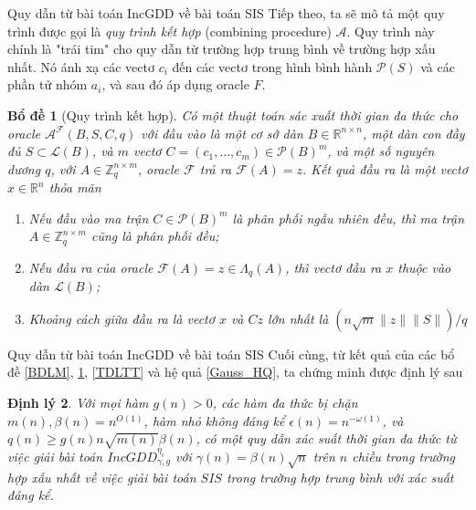 \documentclass[notheorems,envcountsect,serif,12pt]{beamer}
\providecommand{\norm}[1]{\lVert#1\rVert}
\newcommand{\R}{\mathbb{R}}
\newcommand{\Z}{\mathbb{Z}}
\numberwithin{equation}{section}
\newtheorem{theorem}{Định lý}[section]
\newtheorem{lemma}[theorem]{Bổ đề}
\theoremstyle{definition}
\numberwithin{equation}{section}
\begin{document}
\begin{frame}{Quy dẫn từ bài toán IncGDD về bài toán SIS}
	Tiếp theo, ta sẽ mô tả một quy trình được gọi là \textit{quy trình kết hợp} (combining procedure) $\mathcal{A}$. Quy trình này chính là "trái tim" cho quy dẫn từ trường hợp trung bình về trường hợp xấu nhất. Nó ánh xạ các vectơ $c_i$ đến các vectơ trong hình bình hành $\mathcal{P}(S)$ và các phần tử nhóm $a_i$, và sau đó áp dụng oracle $F$.
	\begin{lemma}[Quy trình kết hợp]\label{QTKH}
		Có một thuật toán sác xuất thời gian đa thức cho oracle $\mathcal{A}^{\mathcal{F}}(B, S, C, q)$ với đầu vào là một cơ sở dàn $B\in \R^{n\times n}$, một dàn con đầy đủ $S\subset \mathcal{L}(B)$, và $m$ vectơ $C=\left(c_1,\ldots, c_m\right)\in \mathcal{P}(B)^m$, và một số nguyên dương $q$, với $A\in \Z_q^{n\times m}$, oracle $\mathcal{F}$ trả ra $\mathcal{F}(A)=z$. Kết quả đầu ra là một vectơ $x\in \R^n$ thỏa mãn
		\begin{enumerate}
			\item Nếu đầu vào ma trận $C\in \mathcal{P}(B)^m$ là phân phối ngẫu nhiên đều, thì ma trận $A\in \Z_q^{n\times m}$ cũng là phân phối đều;
			\item Nếu đầu ra của oracle $\mathcal{F}(A)=z\in\Lambda_q(A)$, thì vectơ đầu ra $x$ thuộc vào dàn $\mathcal{L}(B)$;
			\item Khoảng cách giữa đầu ra là vectơ $x$ và $Cz$ lớn nhất là $\left(n\sqrt{m}\norm{z}\norm{S}\right)/q$
		\end{enumerate}
	\end{lemma}
\end{frame}
\begin{frame}{Quy dẫn từ bài toán IncGDD về bài toán SIS}
	Cuối cùng, từ kết quả của các bổ đề \ref{BDLM}, \ref{QTKH}, \ref{TDLTT} và hệ quả \ref{Gauss_HQ}, ta chứng minh được định lý sau
\begin{theorem}\label{IncGDD-SIS}
	Với mọi hàm $g(n)>0$, các hàm đa thức bị chặn $m(n), \beta(n)=n^{O(1)}$, hàm nhỏ không đáng kể $\epsilon(n)=n^{-\omega(1)}$, và $q(n)\ge g(n)n\sqrt{m(n)}\beta(n)$, có một quy dẫn xác suất thời gian đa thức từ việc giải bài toán $IncGDD_{\gamma, g}^{\eta_\epsilon}$ với $\gamma(n)=\beta(n)\sqrt{n}$ trên $n$ chiều trong trường hợp xấu nhất về việc giải bài toán $SIS$ trong trường hợp trung bình với xác suất đáng kể.
\end{theorem}
\end{frame}
\end{document}
